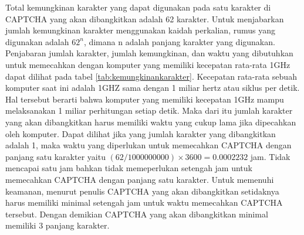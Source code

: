 Total kemungkinan karakter yang dapat digunakan pada satu karakter di CAPTCHA yang akan dibangkitkan adalah 62 karakter. Untuk menjabarkan jumlah kemungkinan karakter menggunakan kaidah perkalian, rumus yang digunakan adalah $62^n$, dimana n adalah panjang karakter yang digunakan. Penjabaran jumlah karakter, jumlah kemungkinan, dan waktu yang dibutuhkan untuk memecahkan dengan komputer yang memiliki kecepatan rata-rata 1GHz dapat dilihat pada tabel \ref{tab:kemungkinankarakter}. Kecepatan rata-rata sebuah komputer saat ini adalah 1GHZ sama dengan 1 miliar hertz atau siklus per detik. Hal tersebut berarti bahwa komputer yang memiliki kecepatan 1GHz mampu melaksanakan 1 miliar perhitungan setiap detik. Maka dari itu jumlah karakter yang akan dibangkitkan harus memiliki waktu yang cukup lama jika dipecahkan oleh komputer. Dapat dilihat jika yang jumlah karakter yang dibangkitkan adalah 1, maka waktu yang diperlukan untuk memecahkan CAPTCHA dengan panjang satu karakter yaitu $(62 / 1000000000) \times 3600 = 0.0002232$ jam. Tidak mencapai satu jam bahkan tidak memeperlukan setengah jam untuk memecahkan CAPTCHA dengan panjang satu karakter.
Untuk memenuhi keamanan, menurut penulis CAPTCHA yang akan dibangkitkan setidaknya harus memiliki minimal setengah jam untuk waktu memecahkan CAPTCHA tersebut. Dengan demikian CAPTCHA yang akan dibangkitkan minimal memiliki 3 panjang karakter.   

